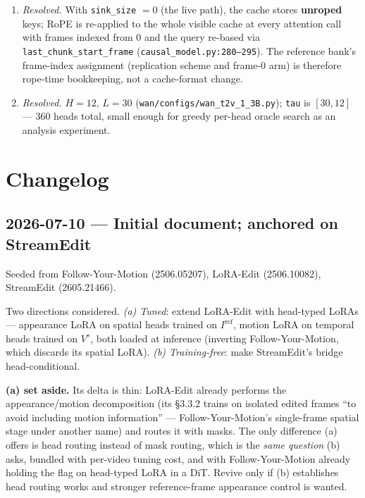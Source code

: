 \documentclass{article}
\begin{document}
\begin{enumerate}
        \texttt{timestep = context\_noise} $= 0$
        (\texttt{configs/default\_config.yaml:10},
        \texttt{edit\_causal\_inference.py:322--376}), same convention as
        committed cache blocks. Cache the ref bank at $t=0$, not $t^{*}$.
  \item \emph{Resolved.} With \texttt{sink\_size} $= 0$ (the live path), the
        cache stores \textbf{unroped} keys; RoPE is re-applied to the whole
        visible cache at every attention call with frames indexed from 0 and the
        query re-based via \texttt{last\_chunk\_start\_frame}
        (\texttt{causal\_model.py:280--295}). The reference bank's frame-index
        assignment (replication scheme and frame-$0$ arm) is therefore rope-time
        bookkeeping, not a cache-format change.
  \item \emph{Resolved.} $H = 12$, $L = 30$
        (\texttt{wan/configs/wan\_t2v\_1\_3B.py}); \texttt{tau} is $[30, 12]$
        --- 360 heads total, small enough for greedy per-head oracle search as
        an analysis experiment.
\end{enumerate}

\section{Changelog}

\subsection*{2026-07-10 --- Initial document; anchored on StreamEdit}

Seeded from Follow-Your-Motion (2506.05207), LoRA-Edit (2506.10082), StreamEdit
(2605.21466).

Two directions considered. \emph{(a) Tuned}: extend LoRA-Edit with head-typed
LoRAs --- appearance LoRA on spatial heads trained on $I^{\mathrm{ref}}$, motion
LoRA on temporal heads trained on $V^{s}$, both loaded at inference (inverting
Follow-Your-Motion, which discards its spatial LoRA). \emph{(b) Training-free}:
make StreamEdit's bridge head-conditional.

\textbf{(a) set aside.} Its delta is thin: LoRA-Edit already performs the
appearance/motion decomposition (its \S3.3.2 trains on isolated edited frames
``to avoid including motion information'' --- Follow-Your-Motion's single-frame
spatial stage under another name) and routes it with masks. The only difference
(a) offers is head routing instead of mask routing, which is the \emph{same
question} (b) asks, bundled with per-video tuning cost, and with
Follow-Your-Motion already holding the flag on head-typed LoRA in a DiT. Revive
only if (b) establishes head routing works and stronger reference-frame
appearance control is wanted.
\end{document}
